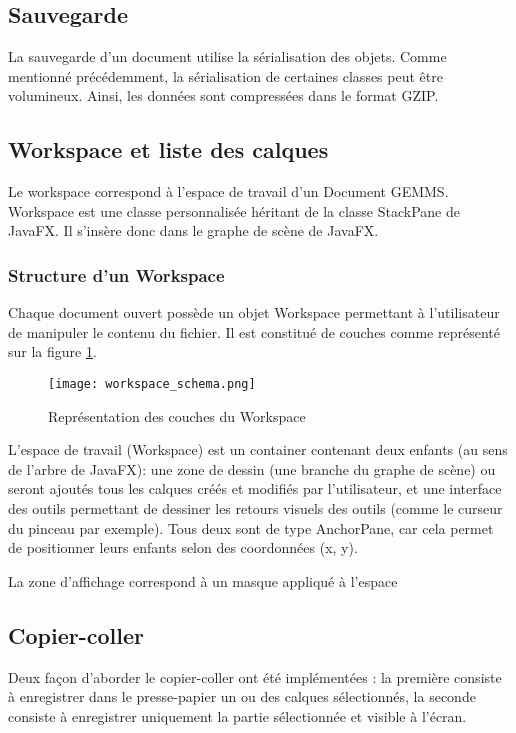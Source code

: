 \subsection{Sauvegarde}
La sauvegarde d'un document utilise la sérialisation des objets. Comme mentionné précédemment, la sérialisation de certaines classes peut être volumineux. Ainsi, les données sont compressées dans le format GZIP.

\subsection{Workspace et liste des calques}
Le \gls{workspace} correspond à l'espace de travail d'un Document GEMMS. Workspace est une classe personnalisée héritant de la classe StackPane de JavaFX. Il s'insère donc dans le graphe de scène de JavaFX. 

\subsubsection{Structure d'un Workspace}
Chaque document ouvert possède un objet Workspace permettant à l'utilisateur de manipuler le contenu du fichier. Il est constitué de couches comme représenté sur la figure \ref{fig:workspace_representation}.


\begin{figure}[H]
	\caption{Représentation des couches du Workspace}
	\centering
	\texttt{[image: workspace\_schema.png]}
	\label{fig:workspace_representation}
\end{figure}

L'espace de travail (Workspace) est un container contenant deux enfants (au sens de l'arbre de JavaFX): une zone de dessin (une branche du graphe de scène) ou seront ajoutés tous les calques créés et modifiés par l'utilisateur, et une interface des outils permettant de dessiner les retours visuels des outils (comme le curseur du pinceau par exemple). Tous deux sont de type AnchorPane, car cela permet de positionner leurs enfants selon des coordonnées (x, y).
\par
La zone d'affichage correspond à un masque appliqué à l'espace


\subsection{Copier-coller}
Deux façon d'aborder le copier-coller ont été implémentées : la première consiste à enregistrer dans le presse-papier un ou des calques sélectionnés, la seconde consiste à enregistrer uniquement la partie sélectionnée et visible à l'écran.


